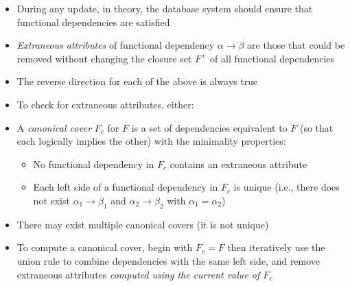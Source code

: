 \documentclass[a4paper]{article}
\begin{document}
\begin{itemize}
\item During any update, in theory, the database system should ensure that functional dependencies are satisfied
\item \emph{Extraneous attributes} of functional dependency $\alpha\rightarrow\beta$ are those that could be removed without changing the closure set $F^+$ of all functional dependencies
\item The reverse direction for each of the above is always true
\item To check for extraneous attributes, either:
\item A \emph{canonical cover} $F_c$ for $F$ is a set of dependencies equivalent to $F$ (so that each logically implies the other) with the minimality properties:
\begin{itemize}
\item No functional dependency in $F_c$ contains an extraneous attribute
\item Each left side of a functional dependency in $F_c$ is unique (i.e., there does not exist $\alpha_1\rightarrow\beta_1$ and $\alpha_2\rightarrow\beta_2$ with $\alpha_1=\alpha_2$)
\end{itemize}
\item There may exist multiple canonical covers (it is not unique)
\item To compute a canonical cover, begin with $F_c=F$ then iteratively use the union rule to combine dependencies with the same left side, and remove extraneous attributes \textit{computed using the current value of $F_c$}
\end{itemize}
\end{document}
